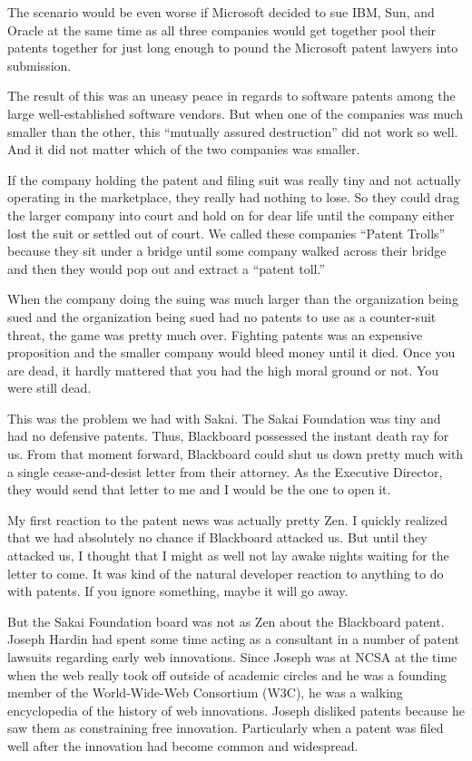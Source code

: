 \documentclass[12pt]{book}
\begin{document}
The scenario would be even worse if Microsoft decided to sue IBM, Sun,
and Oracle at the same time as all three companies would get together
pool their patents together for just long enough to
pound the Microsoft patent lawyers into submission.

The result of this was an uneasy peace in regards to software patents
among the large well-established software vendors.  But when one of the
companies was much smaller than the other, this
``mutually assured destruction'' did not work so well.  And it did
not matter which of the two companies was smaller.

If the company holding the patent and filing suit
was really tiny and not actually operating in the
marketplace, they really had nothing
to lose.  So they could drag the larger company into court
and hold on for dear life until the company either lost the suit
or settled out of court.  We called these companies ``Patent
Trolls'' because they sit under a bridge until some company walked
across their bridge and then they would pop out and extract
a ``patent toll.''

When the company doing the suing was much larger than the organization
being sued and the organization being sued had no patents to use
as a counter-suit threat, the game was pretty much over.  Fighting
patents was an expensive proposition and the smaller company
would bleed money until it died.  Once you are dead, it hardly mattered
that you had the high moral ground or not.   You were still dead.

This was the problem we had with Sakai.  The Sakai Foundation was
tiny and had no defensive patents.  Thus, Blackboard possessed the instant death ray
for us.  From that moment forward, Blackboard could shut us down
pretty much with a single cease-and-desist letter from their
attorney.   As the Executive Director, they would send that letter
to me and I would be the one to open it.

My first reaction to the patent news was actually pretty Zen.  I
quickly realized that we had absolutely no chance if Blackboard
attacked us.  But until they attacked us, I thought that I might
as well not lay awake nights waiting for the letter to come.
It was kind of the natural developer reaction to anything to do
with patents.   If you ignore something, maybe it will go away.

But the Sakai Foundation board was not as Zen about the Blackboard
patent.  Joseph Hardin had spent some time acting as a
consultant in a number of patent lawsuits regarding early
web innovations.  Since Joseph was at NCSA at the time when
the web really took off outside of academic circles and he was a
founding member of the World-Wide-Web Consortium (W3C),
he was a walking encyclopedia of the history of web innovations.
Joseph disliked patents because he saw them as constraining
free innovation.  Particularly when a patent was filed
well after the innovation had become common and widespread.
\end{document}
